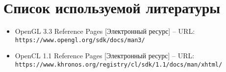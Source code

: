 \newpage
\section{Список используемой литературы}

\begin{flushleft}
\begin{itemize}
    \item OpenGL 3.3 Reference Pages [Электронный ресурс] -- \lb
    URL: \verb|https://www.opengl.org/sdk/docs/man3/|

    \item OpenCL 1.1 Reference Pages [Электронный ресурс] -- \lb
    URL: \verb|https://www.khronos.org/registry/cl/sdk/1.1/docs/man/xhtml/|

\end{itemize}
\end{flushleft}

